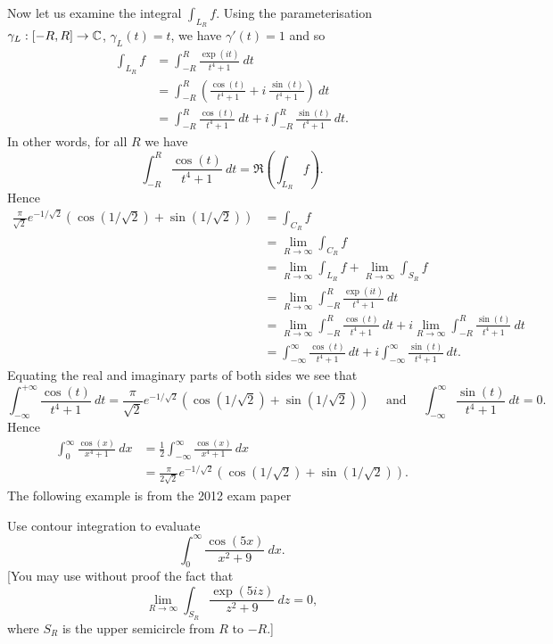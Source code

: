 Now let us examine the integral $\displaystyle \int_{L_R} f$.  Using the parameterisation $\gamma_L:[-R,R] \to \mathbb{C}$, $\gamma_L (t) = t$, we have $\gamma ' (t) = 1$ and so
\begin{align*}
\int_{L_R} f &= \int_{-R}^R \frac{\exp(it)}{t^4+1}\ dt \\
& = \int_{-R}^{R} \left( \frac{\cos(t)}{t^4+1} + i\ \frac{\sin(t)}{t^4+1} \right)\ dt \\
& = \int_{-R}^R \frac{\cos(t)}{t^4+1}\ dt + i \int_{-R}^R \frac{\sin(t)}{t^4+1}\ dt.
\end{align*}
In other words, for all $R$ we have
\[
\int_{-R}^R \frac{\cos(t)}{t^4+1}\ dt = \Re \left( \int_{L_R} f \right).
\]
Hence
\begin{align*}
\frac{\pi}{\sqrt{2}} e^{-1/\sqrt{2}} \left( \cos (1/\sqrt{2})+\sin(1/\sqrt{2}) \right) & = \int_{C_R} f \\
& = \lim_{R \to \infty} \int_{C_R} f \\
& = \lim_{R \to \infty} \int_{L_R} f + \lim_{R \to \infty} \int_{S_R} f \\
& = \lim_{R \to \infty} \int_{-R}^{R} \frac{\exp(it)}{t^4+1}\ dt \\
& = \lim_{R \to \infty} \int_{-R}^{R} \frac{\cos(t)}{t^4+1}\ dt + i \lim_{R \to \infty} \int_{-R}^R \frac{\sin(t)}{t^4+1}\ dt \\
&=  \int_{-\infty}^{\infty} \frac{\cos(t)}{t^4+1}\ dt + i \int_{-\infty}^{\infty} \frac{\sin (t)}{t^4+1}\ dt.
\end{align*}
Equating the real and imaginary parts of both sides we see that
\[
\int_{-\infty}^{+\infty}  \frac{\cos(t)}{t^4+1}\ dt = \frac{\pi}{\sqrt{2}} e^{-1/\sqrt{2}} \left( \cos (1/\sqrt{2})+\sin(1/\sqrt{2}) \right) \quad\text{ and }\quad \int_{-\infty}^{\infty} \frac{\sin (t)}{t^4+1}\ dt =0.
\]
Hence
\begin{align*}
\int_0^{\infty} \frac{\cos(x)}{x^4+1}\ dx &= \frac{1}{2} \int_{-\infty}^{\infty} \frac{\cos(x)}{x^4+1}\ dx \\
& = \frac{\pi}{2\sqrt{2}} e^{-1/\sqrt{2}} \left( \cos (1/\sqrt{2})+\sin(1/\sqrt{2}) \right).
\end{align*}
The following example is from the 2012 exam paper
\begin{example}
Use contour integration to evaluate
\[
\int_0^{\infty} \frac{\cos(5x)}{x^2+9}\ dx.
\]
[You may use without proof the fact that
\[
\lim_{R \to \infty} \int_{S_R} \frac{\exp(5iz)}{z^2+9}\ dz = 0,
\]
where $S_R$ is the upper semicircle from $R$ to $-R$.]
\end{example}
